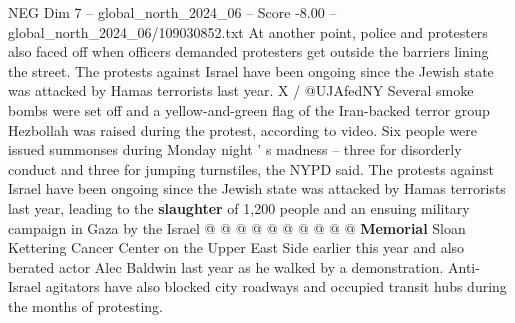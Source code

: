 \begin{textsample}{NEG Dim 7 – global\_north\_2024\_06 – Score -8.00 – global\_north\_2024\_06/109030852.txt}
At another point, police and protesters also faced off when officers demanded protesters get outside the barriers lining the street.
The protests against Israel have been ongoing since the Jewish state was attacked by Hamas terrorists last year.
X / @UJAfedNY Several smoke bombs were set off and a yellow-and-green flag of the Iran-backed terror group Hezbollah was raised during the protest, according to video.
Six people were issued summonses during Monday night ' s madness -- three for disorderly conduct and three for jumping turnstiles, the NYPD said.
The protests against Israel have been ongoing since the Jewish state was attacked by Hamas terrorists last year, leading to the \textbf{slaughter} of 1,200 people and an ensuing military campaign in Gaza by the Israel @ @ @ @ @ @ @ @ @ @ \textbf{Memorial} Sloan Kettering Cancer Center on the Upper East Side earlier this year and also berated actor Alec Baldwin last year as he walked by a demonstration.
Anti-Israel agitators have also blocked city roadways and occupied transit hubs during the months of protesting.

\end{textsample}
